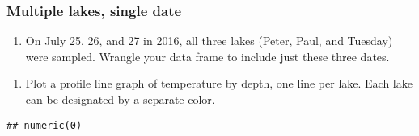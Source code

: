 \documentclass[]{article}
\newenvironment{Shaded}{\begin{snugshade}}{\end{snugshade}}
\newcommand{\DecValTok}[1]{\textcolor[rgb]{0.00,0.00,0.81}{#1}}
\newcommand{\KeywordTok}[1]{\textcolor[rgb]{0.13,0.29,0.53}{\textbf{#1}}}
\newcommand{\NormalTok}[1]{#1}
\newcommand{\OperatorTok}[1]{\textcolor[rgb]{0.81,0.36,0.00}{\textbf{#1}}}
\newcommand{\StringTok}[1]{\textcolor[rgb]{0.31,0.60,0.02}{#1}}
\providecommand{\tightlist}{%
  \setlength{\itemsep}{0pt}\setlength{\parskip}{0pt}}
\begin{document}
\hypertarget{multiple-lakes-single-date}{%
\subsubsection{Multiple lakes, single
date}\label{multiple-lakes-single-date}}

\begin{enumerate}
\def\labelenumi{\arabic{enumi}.}
\setcounter{enumi}{7}
\tightlist
\item
  On July 25, 26, and 27 in 2016, all three lakes (Peter, Paul, and
  Tuesday) were sampled. Wrangle your data frame to include just these
  three dates.
\end{enumerate}

\begin{Shaded}
\end{Shaded}

\begin{enumerate}
\def\labelenumi{\arabic{enumi}.}
\setcounter{enumi}{8}
\tightlist
\item
  Plot a profile line graph of temperature by depth, one line per lake.
  Each lake can be designated by a separate color.
\end{enumerate}

\begin{Shaded}
\end{Shaded}

\begin{verbatim}
## numeric(0)
\end{verbatim}
\end{document}
